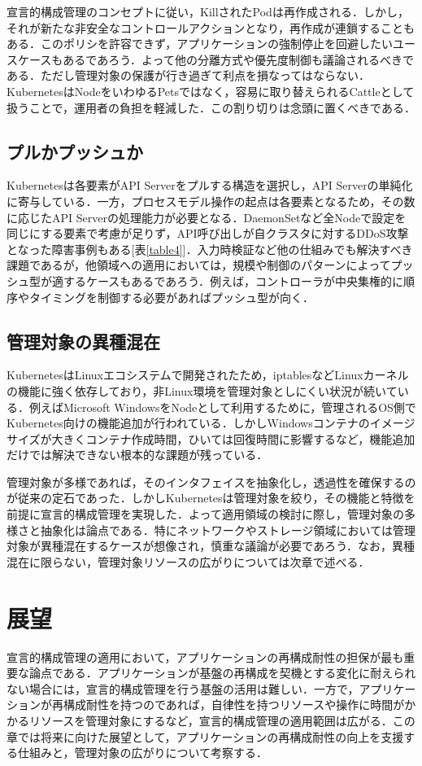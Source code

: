\documentclass[12pt,a4j]{ujreport}
\begin{document}
宣言的構成管理のコンセプトに従い，KillされたPodは再作成される．しかし，それが新たな非安全なコントロールアクションとなり，再作成が連鎖することもある\cite{ref6}．このポリシを許容できず，アプリケーションの強制停止を回避したいユースケースもあるであろう．よって他の分離方式や優先度制御も議論されるべきである．ただし管理対象の保護が行き過ぎて利点を損なってはならない．KubernetesはNodeをいわゆるPetsではなく，容易に取り替えられるCattle\cite{ref38}として扱うことで，運用者の負担を軽減した．この割り切りは念頭に置くべきである．

\section{プルかプッシュか}
Kubernetesは各要素がAPI Serverをプルする構造を選択し，API Serverの単純化に寄与している．一方，プロセスモデル操作の起点は各要素となるため，その数に応じたAPI Serverの処理能力が必要となる．DaemonSetなど全Nodeで設定を同じにする要素で考慮が足りず，API呼び出しが自クラスタに対するDDoS攻撃となった障害事例もある[表\ref{table4}]．入力時検証など他の仕組みでも解決すべき課題であるが，他領域への適用においては，規模や制御のパターンによってプッシュ型が適するケースもあるであろう．例えば，コントローラが中央集権的に順序やタイミングを制御する必要があればプッシュ型が向く．

\section{管理対象の異種混在}
KubernetesはLinuxエコシステムで開発されたため，iptablesなどLinuxカーネルの機能に強く依存しており，非Linux環境を管理対象としにくい状況が続いている．例えばMicrosoft WindowsをNodeとして利用するために，管理されるOS側でKubernetes向けの機能追加が行われている\cite{ref39}．しかしWindowsコンテナのイメージサイズが大きくコンテナ作成時間，ひいては回復時間に影響するなど，機能追加だけでは解決できない根本的な課題が残っている．

管理対象が多様であれば，そのインタフェイスを抽象化し，透過性を確保するのが従来の定石であった．しかしKubernetesは管理対象を絞り，その機能と特徴を前提に宣言的構成管理を実現した．よって適用領域の検討に際し，管理対象の多様さと抽象化は論点である．特にネットワークやストレージ領域においては管理対象が異種混在するケースが想像され，慎重な議論が必要であろう．なお，異種混在に限らない，管理対象リソースの広がりについては次章で述べる．

\chapter{展望}
宣言的構成管理の適用において，アプリケーションの再構成耐性の担保が最も重要な論点である．アプリケーションが基盤の再構成を契機とする変化に耐えられない場合には，宣言的構成管理を行う基盤の活用は難しい．一方で，アプリケーションが再構成耐性を持つのであれば，自律性を持つリソースや操作に時間がかかるリソースを管理対象にするなど，宣言的構成管理の適用範囲は広がる．この章では将来に向けた展望として，アプリケーションの再構成耐性の向上を支援する仕組みと，管理対象の広がりについて考察する．
\end{document}
